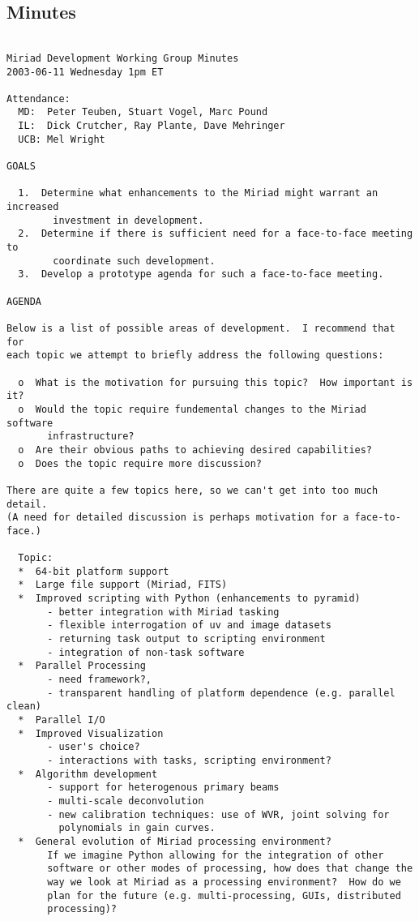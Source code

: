 \subsection{Minutes}

\begin{verbatim}

Miriad Development Working Group Minutes
2003-06-11 Wednesday 1pm ET 

Attendance:
  MD:  Peter Teuben, Stuart Vogel, Marc Pound
  IL:  Dick Crutcher, Ray Plante, Dave Mehringer
  UCB: Mel Wright

GOALS

  1.  Determine what enhancements to the Miriad might warrant an increased
        investment in development.
  2.  Determine if there is sufficient need for a face-to-face meeting to 
        coordinate such development.
  3.  Develop a prototype agenda for such a face-to-face meeting.

AGENDA

Below is a list of possible areas of development.  I recommend that for 
each topic we attempt to briefly address the following questions:

  o  What is the motivation for pursuing this topic?  How important is it? 
  o  Would the topic require fundemental changes to the Miriad software 
       infrastructure?  
  o  Are their obvious paths to achieving desired capabilities?
  o  Does the topic require more discussion?

There are quite a few topics here, so we can't get into too much detail.  
(A need for detailed discussion is perhaps motivation for a face-to-face.)  

  Topic:
  *  64-bit platform support
  *  Large file support (Miriad, FITS)
  *  Improved scripting with Python (enhancements to pyramid)
       - better integration with Miriad tasking
       - flexible interrogation of uv and image datasets
       - returning task output to scripting environment
       - integration of non-task software
  *  Parallel Processing
       - need framework?, 
       - transparent handling of platform dependence (e.g. parallel clean)
  *  Parallel I/O
  *  Improved Visualization
       - user's choice?  
       - interactions with tasks, scripting environment?
  *  Algorithm development
       - support for heterogenous primary beams
       - multi-scale deconvolution
       - new calibration techniques: use of WVR, joint solving for
         polynomials in gain curves.
  *  General evolution of Miriad processing environment?
       If we imagine Python allowing for the integration of other
       software or other modes of processing, how does that change the
       way we look at Miriad as a processing environment?  How do we
       plan for the future (e.g. multi-processing, GUIs, distributed
       processing)?


\end{verbatim}
